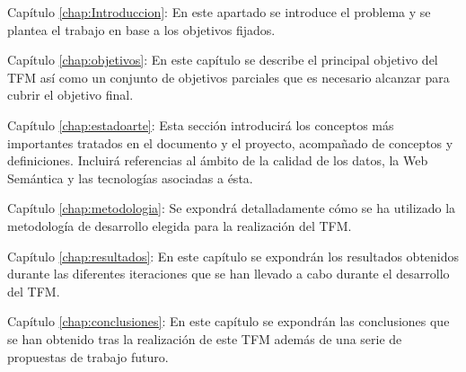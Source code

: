\begin{definitionlist}
\item[Capítulo \ref{chap:Introduccion}: \nameref{chap:Introduccion}] En este
  apartado se introduce el problema y se plantea el trabajo en base a los
  objetivos fijados. 


\item[Capítulo \ref{chap:objetivos}: \nameref{chap:objetivos}] En este capítulo
  se describe el principal objetivo del \acs{TFM} así como un conjunto de
  objetivos parciales que es necesario alcanzar para cubrir el objetivo
  final. 

\item[Capítulo \ref{chap:estadoarte}: \nameref{chap:estadoarte}] Esta sección
  introducirá los conceptos más importantes tratados en el documento y el
  proyecto, acompañado de conceptos y definiciones. Incluirá referencias al
  ámbito de la calidad de los datos, la Web Semántica y las tecnologías
  asociadas a ésta. 

\item[Capítulo \ref{chap:metodologia}: \nameref{chap:metodologia}] Se expondrá
  detalladamente cómo se ha utilizado la metodología de desarrollo elegida para la realización del \acs{TFM}.

\item[Capítulo \ref{chap:resultados}: \nameref{chap:resultados}] En este
  capítulo se expondrán los resultados obtenidos durante las diferentes
  iteraciones que se han llevado a cabo durante el desarrollo del
  \acs{TFM}. 

\item[Capítulo \ref{chap:conclusiones}: \nameref{chap:conclusiones}] En este
  capítulo se expondrán las conclusiones que se han obtenido tras la realización
  de este \acs{TFM} además de una serie de propuestas de trabajo futuro. 


\end{definitionlist}




